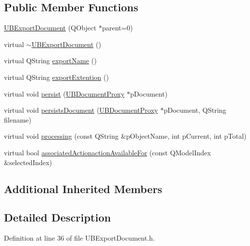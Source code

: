 \subsection*{Public Member Functions}
\begin{DoxyCompactItemize}
\item 
\hyperlink{class_u_b_export_document_a19b67965e54a629fed0a83a032883489}{U\-B\-Export\-Document} (Q\-Object $\ast$parent=0)
\item 
virtual \hyperlink{class_u_b_export_document_a126ec502aa58f957a0c7da5d18c54e62}{$\sim$\-U\-B\-Export\-Document} ()
\item 
virtual Q\-String \hyperlink{class_u_b_export_document_a490257a78d799ace28deb2d24a608852}{export\-Name} ()
\item 
virtual Q\-String \hyperlink{class_u_b_export_document_abcb04f3def55bbd22fe0931359c2536d}{export\-Extention} ()
\item 
virtual void \hyperlink{class_u_b_export_document_ae0688e605976d7cd3fbae96c826e3638}{persist} (\hyperlink{class_u_b_document_proxy}{U\-B\-Document\-Proxy} $\ast$p\-Document)
\item 
virtual void \hyperlink{class_u_b_export_document_a24861f6f95b01dab4ef70ae05d0acaa6}{persists\-Document} (\hyperlink{class_u_b_document_proxy}{U\-B\-Document\-Proxy} $\ast$p\-Document, Q\-String filename)
\item 
virtual void \hyperlink{class_u_b_export_document_a3793fcd1f227b97c4d314817d66463d1}{processing} (const Q\-String \&p\-Object\-Name, int p\-Current, int p\-Total)
\item 
virtual bool \hyperlink{class_u_b_export_document_a3549c62db381a65c75beac3d89e6622d}{associated\-Actionaction\-Available\-For} (const Q\-Model\-Index \&selected\-Index)
\end{DoxyCompactItemize}
\subsection*{Additional Inherited Members}


\subsection{Detailed Description}


Definition at line 36 of file U\-B\-Export\-Document.\-h.



